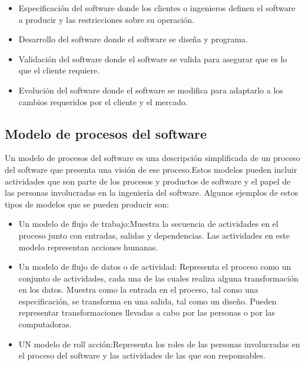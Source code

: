 	\begin{itemize}
		\item Especificación del software donde los clientes o ingenieros definen el software a producir y las restricciones sobre su operación.
		\item Desarrollo del software donde el software se diseña y programa.
		\item Validación del software donde el software se valida para asegurar que es lo que el cliente requiere.
		\item Evolución del software donde el software se modifica para adaptarlo a los cambios requeridos por el cliente y el mercado. 
	\end{itemize}
	
\subsection{Modelo de procesos del software }
Un modelo de procesos del software es una descripción simplificada de un proceso del software que presenta una visión de ese proceso.Estos modelos pueden incluir actividades que son parte de los procesos y productos de software y el papel de las personas involucradas en la ingeniería del software. Algunos ejemplos de estos tipos de modelos que se pueden producir son:\\

\begin{itemize}
	\item Un modelo de flujo de trabajo:Muestra la secuencia de actividades en el proceso junto con entradas, salidas y dependencias. Las actividades en este modelo representan acciones humanas.
	\item Un modelo de flujo de datos o de actividad: Representa el proceso como un conjunto de actividades, cada una de las cuales realiza alguna transformación en los datos. Muestra como la entrada en el proceso, tal como una especificación, se transforma en una salida, tal como un diseño. Pueden representar transformaciones llevadas a cabo por las personas o por las computadoras.
	\item UN modelo de roll acción:Representa los roles de las personas involucradas en el proceso del software y las actividades de las que son responsables. 
\end{itemize}





